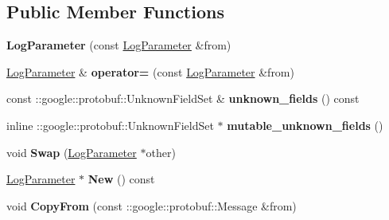 \subsection*{Public Member Functions}
\begin{DoxyCompactItemize}
\item 
\mbox{\label{classcaffe_1_1_log_parameter_a0e07653142d87cd7ccb9204f44afb97f}} 
{\bfseries Log\+Parameter} (const \mbox{\hyperlink{classcaffe_1_1_log_parameter}{Log\+Parameter}} \&from)
\item 
\mbox{\label{classcaffe_1_1_log_parameter_a314f94a90c424f0217cfcc4cde48eb69}} 
\mbox{\hyperlink{classcaffe_1_1_log_parameter}{Log\+Parameter}} \& {\bfseries operator=} (const \mbox{\hyperlink{classcaffe_1_1_log_parameter}{Log\+Parameter}} \&from)
\item 
\mbox{\label{classcaffe_1_1_log_parameter_a79ee366f038eb5003d4a68ef7db7011e}} 
const \+::google\+::protobuf\+::\+Unknown\+Field\+Set \& {\bfseries unknown\+\_\+fields} () const
\item 
\mbox{\label{classcaffe_1_1_log_parameter_a7c2156fc8dab8ce80c6ce987bb40deee}} 
inline \+::google\+::protobuf\+::\+Unknown\+Field\+Set $\ast$ {\bfseries mutable\+\_\+unknown\+\_\+fields} ()
\item 
\mbox{\label{classcaffe_1_1_log_parameter_aa7932981e9e4debaa50ec9b553dc16d2}} 
void {\bfseries Swap} (\mbox{\hyperlink{classcaffe_1_1_log_parameter}{Log\+Parameter}} $\ast$other)
\item 
\mbox{\label{classcaffe_1_1_log_parameter_a804f7ee5ceb66717bf090fff0339ffb3}} 
\mbox{\hyperlink{classcaffe_1_1_log_parameter}{Log\+Parameter}} $\ast$ {\bfseries New} () const
\item 
\mbox{\label{classcaffe_1_1_log_parameter_ad7a8c68335bcd1afb04ef175e7b06528}} 
void {\bfseries Copy\+From} (const \+::google\+::protobuf\+::\+Message \&from)
\item 
\mbox{\label{classcaffe_1_1_log_parameter_a540eb5949b28d2dafe7d9c0cc92f05cd}} 

\end{DoxyCompactItemize}
